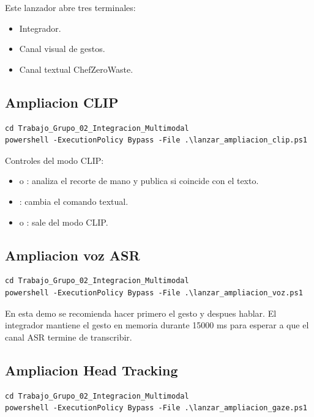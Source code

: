 \documentclass[12pt,a4paper]{article}
\newcommand{\codepath}[1]{\texttt{\detokenize{#1}}}
\begin{document}
Este lanzador abre tres terminales:

\begin{itemize}
    \item Integrador.
    \item Canal visual de gestos.
    \item Canal textual ChefZeroWaste.
\end{itemize}

\subsection{Ampliacion CLIP}

\begin{lstlisting}[caption={Lanzar la ampliacion de embeddings multimodales.}]
cd Trabajo_Grupo_02_Integracion_Multimodal
powershell -ExecutionPolicy Bypass -File .\lanzar_ampliacion_clip.ps1
\end{lstlisting}

Controles del modo CLIP:

\begin{itemize}
    \item \codepath{ESPACIO} o \codepath{ENTER}: analiza el recorte de mano y publica si coincide con el texto.
    \item \codepath{T}: cambia el comando textual.
    \item \codepath{Q} o \codepath{ESC}: sale del modo CLIP.
\end{itemize}

\subsection{Ampliacion voz ASR}

\begin{lstlisting}[caption={Lanzar la ampliacion de voz en tiempo real.}]
cd Trabajo_Grupo_02_Integracion_Multimodal
powershell -ExecutionPolicy Bypass -File .\lanzar_ampliacion_voz.ps1
\end{lstlisting}

En esta demo se recomienda hacer primero el gesto y despues hablar. El integrador mantiene el gesto en memoria durante 15000 ms para esperar a que el canal ASR termine de transcribir.

\subsection{Ampliacion Head Tracking}

\begin{lstlisting}[caption={Lanzar la ampliacion de head tracking + gestos.}]
cd Trabajo_Grupo_02_Integracion_Multimodal
powershell -ExecutionPolicy Bypass -File .\lanzar_ampliacion_gaze.ps1
\end{lstlisting}
\end{document}
